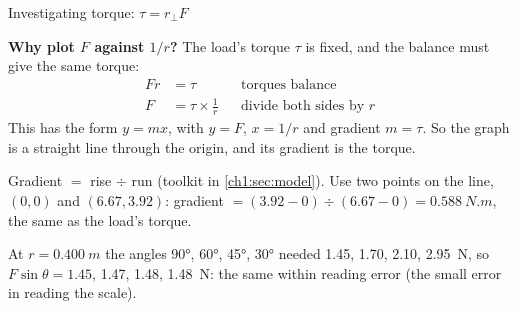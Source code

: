 \begin{experiment}{Investigating torque: $\tau = r_\perp F$}
{\begin{sidebyside}[0.42]
  \label{ch3:fig:torquegraph}
\end{sidebyside}
  \textbf{Why plot $F$ against $1/r$?} The load's torque $\tau$ is fixed, and the balance must
  give the same torque:
  \begin{align*}
    Fr &= \tau && \text{torques balance}\\
    F &= \tau \times \frac{1}{r} && \text{divide both sides by } r
  \end{align*}
  This has the form $y = mx$, with $y = F$, $x = 1/r$ and gradient $m = \tau$. So the graph is a
  straight line through the origin, and its gradient is the torque.

  Gradient $=$ rise $\div$ run (toolkit in \cref{ch1:sec:model}). Use two points on the line,
  $(0, 0)$ and $(6.67, 3.92)$: gradient $= (3.92 - 0) \div (6.67 - 0) = \qty{0.588}{N.m}$, the
  same as the load's torque.

  At $r = \qty{0.400}{m}$ the angles \ang{90}, \ang{60}, \ang{45}, \ang{30} needed 1.45, 1.70, 2.10,
  \qty{2.95}{N}, so $F\sin\theta = 1.45$, 1.47, 1.48, \qty{1.48}{N}: the same within reading
  error (the small error in reading the scale).

}
\end{experiment}
